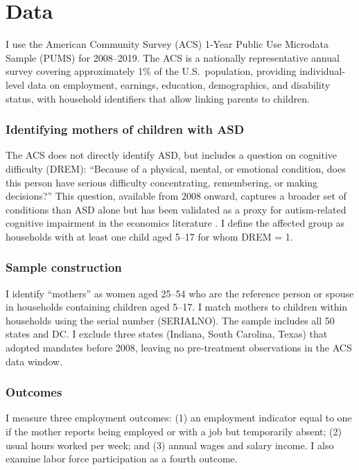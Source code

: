 \documentclass[12pt]{article}
\begin{document}
\section{Data}

I use the American Community Survey (ACS) 1-Year Public Use Microdata Sample (PUMS) for 2008--2019. The ACS is a nationally representative annual survey covering approximately 1\% of the U.S.\ population, providing individual-level data on employment, earnings, education, demographics, and disability status, with household identifiers that allow linking parents to children.

\subsubsection*{Identifying mothers of children with ASD}  The ACS does not directly identify ASD, but includes a question on cognitive difficulty (DREM): ``Because of a physical, mental, or emotional condition, does this person have serious difficulty concentrating, remembering, or making decisions?'' This question, available from 2008 onward, captures a broader set of conditions than ASD alone but has been validated as a proxy for autism-related cognitive impairment in the economics literature \citep{maclean2019}. I define the affected group as households with at least one child aged 5--17 for whom DREM = 1.

\subsubsection*{Sample construction}  I identify ``mothers'' as women aged 25--54 who are the reference person or spouse in households containing children aged 5--17. I match mothers to children within households using the serial number (SERIALNO). The sample includes all 50 states and DC. I exclude three states (Indiana, South Carolina, Texas) that adopted mandates before 2008, leaving no pre-treatment observations in the ACS data window.

\subsubsection*{Outcomes}  I measure three employment outcomes: (1) an employment indicator equal to one if the mother reports being employed or with a job but temporarily absent; (2) usual hours worked per week; and (3) annual wages and salary income. I also examine labor force participation as a fourth outcome.
\end{document}
